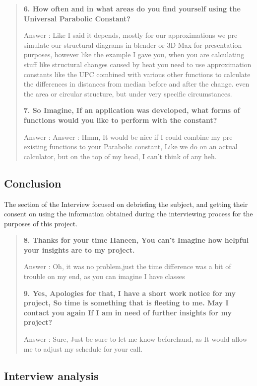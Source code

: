 \documentclass[12pt]{report}
\begin{document}
\begin{flushleft}
     \begin {quote}
    \textbf{6. How often and in what areas do you find yourself using the Universal Parabolic Constant?}
    
    Answer : Like I said it depends, mostly for our approximations we pre simulate our structural diagrams in blender or 3D Max for presentation purposes, however like the example I gave you, when you are calculating stuff like structural changes caused by heat you need to use approximation constants like the UPC combined with various other functions to calculate the differences in distances from median before and after the change. even the area or circular structure, but under very specific circumstances. \hfill \break
   
    \textbf{7. So Imagine, If an application was developed, what forms of functions would you like to perform with the constant?}
    
    Answer : Answer : Hmm, It would be nice if I could combine my pre existing functions to your Parabolic constant, Like we do on an actual calculator, but on the top of my head, I can't think of any heh. \hfill \break
     \end {quote}
    \subsection{Conclusion}

   The section of the Interview focused on debriefing the subject, and getting their consent on using the information obtained during the interviewing process for the purposes of this project. \hfill \break

    \begin {quote}
    \textbf{8. Thanks for your time Haneen, You can't Imagine how helpful your insights are to my project.}
    
    Answer : Oh, it was no problem,just the time difference was a bit of trouble on my end, as you can imagine I have classes \hfill \break

    \textbf{9. Yes, Apologies for that, I have a short work notice for my project, So time is something that is fleeting to me. May I contact you again If I am in need of further insights for my project? }
    
    Answer : Sure, Just be sure to let me know beforehand, as It would allow me to adjust my schedule for your call.\hfill \break
    \end {quote}
    \subsection{Interview analysis}


\end{flushleft}
\end{document}
